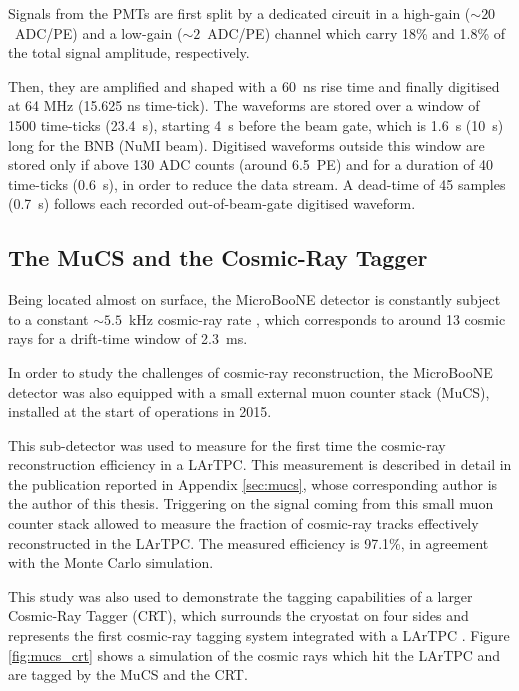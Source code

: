 Signals from the PMTs are first split by a dedicated circuit in a high-gain ($\sim20$~ADC/PE) and a low-gain ($\sim2$~ADC/PE) channel which carry 18\% and 1.8\% of the total signal amplitude, respectively.

Then, they are amplified and shaped with a 60~ns rise time and finally digitised at 64 MHz (15.625 ns time-tick). The waveforms are stored over a window of 1500 time-ticks (23.4~\si{\micro}s), starting 4~\si{\micro}s before the beam gate, which is 1.6~\si{\micro}s (10~\si{\micro}s) long for the BNB (NuMI beam). Digitised waveforms outside this window are stored only if above 130 ADC counts (around 6.5~PE) and for a duration of 40 time-ticks (0.6~\si{\micro}s), in order to reduce the data stream. A dead-time of 45 samples (0.7~\si{\micro}s) follows each recorded out-of-beam-gate digitised waveform.



\subsection{The MuCS and the Cosmic-Ray Tagger}\label{sec:crt}

Being located almost on surface, the MicroBooNE detector is constantly subject to a constant $\sim5.5$~kHz cosmic-ray rate \cite{Acciarri:2017rnj}, which corresponds to around 13 cosmic rays for a drift-time window of 2.3~ms. 

In order to study the challenges of cosmic-ray reconstruction, the MicroBooNE detector was also equipped with a small external muon counter stack (MuCS), installed at the start of operations in 2015. 

This sub-detector was used to measure for the first time the cosmic-ray reconstruction efficiency in a LArTPC. This measurement is described in detail in the publication reported in Appendix \ref{sec:mucs}, whose corresponding author is the author of this thesis. Triggering on the signal coming from this small muon counter stack allowed to measure the fraction of cosmic-ray tracks effectively reconstructed in the LArTPC. The measured efficiency is 97.1\%, in agreement with the Monte Carlo simulation. 

This study was also used to demonstrate the tagging capabilities of a larger Cosmic-Ray Tagger (CRT), which surrounds the cryostat on four sides and represents the first cosmic-ray tagging system integrated with a LArTPC \cite{Auger:2016tjc}. Figure \ref{fig:mucs_crt} shows a simulation of the cosmic rays which hit the LArTPC and are tagged by the MuCS and the CRT.


